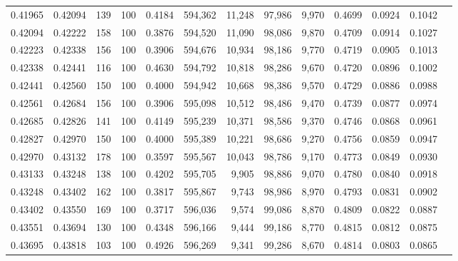 \begin{tabular}{rrrrrrrrrrrrr}
0.41965 & 0.42094 &   139 & 100 &                                     0.4184 & 594,362 &  11,248 &  97,986 &   9,970 & 0.4699 & 0.0924 & 0.1042 \\
0.42094 & 0.42222 &   158 & 100 &                                     0.3876 & 594,520 &  11,090 &  98,086 &   9,870 & 0.4709 & 0.0914 & 0.1027 \\
0.42223 & 0.42338 &   156 & 100 &                                     0.3906 & 594,676 &  10,934 &  98,186 &   9,770 & 0.4719 & 0.0905 & 0.1013 \\
0.42338 & 0.42441 &   116 & 100 &                                     0.4630 & 594,792 &  10,818 &  98,286 &   9,670 & 0.4720 & 0.0896 & 0.1002 \\
0.42441 & 0.42560 &   150 & 100 &                                     0.4000 & 594,942 &  10,668 &  98,386 &   9,570 & 0.4729 & 0.0886 & 0.0988 \\
0.42561 & 0.42684 &   156 & 100 &                                     0.3906 & 595,098 &  10,512 &  98,486 &   9,470 & 0.4739 & 0.0877 & 0.0974 \\
0.42685 & 0.42826 &   141 & 100 &                                     0.4149 & 595,239 &  10,371 &  98,586 &   9,370 & 0.4746 & 0.0868 & 0.0961 \\
0.42827 & 0.42970 &   150 & 100 &                                     0.4000 & 595,389 &  10,221 &  98,686 &   9,270 & 0.4756 & 0.0859 & 0.0947 \\
0.42970 & 0.43132 &   178 & 100 &                                     0.3597 & 595,567 &  10,043 &  98,786 &   9,170 & 0.4773 & 0.0849 & 0.0930 \\
0.43133 & 0.43248 &   138 & 100 &                                     0.4202 & 595,705 &   9,905 &  98,886 &   9,070 & 0.4780 & 0.0840 & 0.0918 \\
0.43248 & 0.43402 &   162 & 100 &                                     0.3817 & 595,867 &   9,743 &  98,986 &   8,970 & 0.4793 & 0.0831 & 0.0902 \\
0.43402 & 0.43550 &   169 & 100 &                                     0.3717 & 596,036 &   9,574 &  99,086 &   8,870 & 0.4809 & 0.0822 & 0.0887 \\
0.43551 & 0.43694 &   130 & 100 &                                     0.4348 & 596,166 &   9,444 &  99,186 &   8,770 & 0.4815 & 0.0812 & 0.0875 \\
0.43695 & 0.43818 &   103 & 100 &                                     0.4926 & 596,269 &   9,341 &  99,286 &   8,670 & 0.4814 & 0.0803 & 0.0865 \\

\end{tabular}
